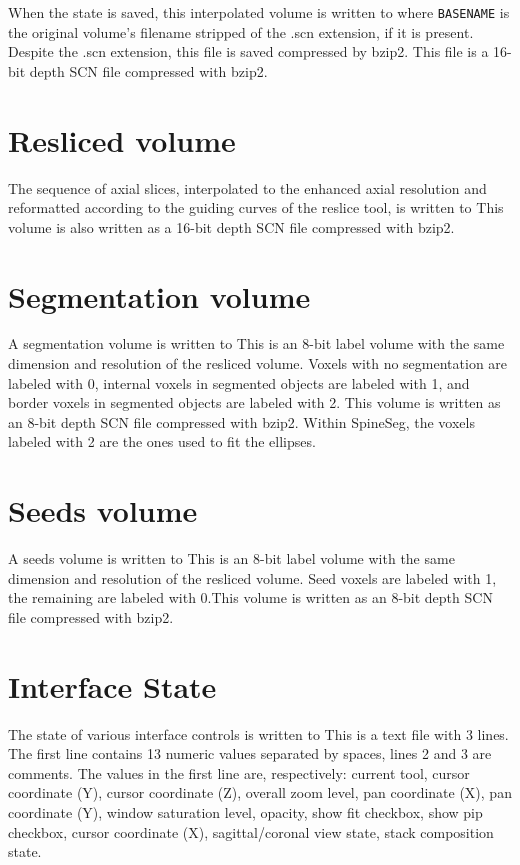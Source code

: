 \documentclass[12pt]{report}
\begin{document}
When the state is saved, this interpolated volume is written to
 where \texttt{BASENAME} is the original
volume's filename stripped of the .scn extension, if it is present.
Despite the .scn extension, this file is saved compressed by
bzip2. This file is a 16-bit depth SCN file compressed with bzip2.

\section{Resliced volume}

The sequence of axial slices, interpolated to the enhanced axial
resolution and reformatted according to the guiding curves of the
reslice tool, is written to  This
volume is also written as a 16-bit depth SCN file compressed with
bzip2.

\section{Segmentation volume}

A segmentation volume is written to 
This is an 8-bit label volume with the same dimension and resolution
of the resliced volume. Voxels with no segmentation are labeled with
0, internal voxels in segmented objects are labeled with 1, and border
voxels in segmented objects are labeled with 2.  This volume is
written as an 8-bit depth SCN file compressed with bzip2. Within
SpineSeg, the voxels labeled with 2 are the ones used to fit the
ellipses.

\section{Seeds volume}

A seeds volume is written to  This is an
8-bit label volume with the same dimension and resolution of the
resliced volume. Seed voxels are labeled with 1, the remaining are
labeled with 0.This volume is written as an 8-bit depth SCN file
compressed with bzip2.

\section{Interface State}

The state of various interface controls is written to
 This is a text file with 3 lines. The
first line contains 13 numeric values separated by spaces, lines 2 and
3 are comments. The values in the first line are, respectively:
current tool, cursor coordinate (Y), cursor coordinate (Z), overall
zoom level, pan coordinate (X), pan coordinate (Y), window saturation
level, opacity, show fit checkbox, show pip checkbox, cursor
coordinate (X), sagittal/coronal view state, stack composition state.
\end{document}
